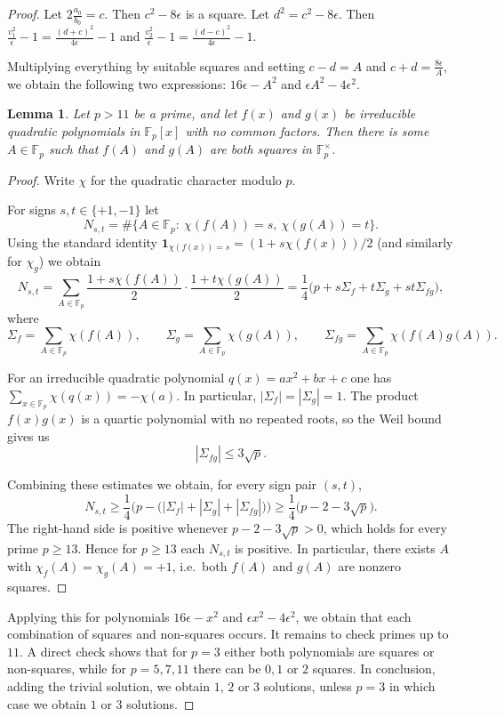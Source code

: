 \documentclass[10pt,leqno]{amsart}
\newcommand{\F}{\mathbb{F}}
\newtheorem{lemma}[theorem]{Lemma}
\theoremstyle{definition}
\theoremstyle{remark}
\numberwithin{theorem}{section}
\begin{document}
\begin{proof}
Let $2\frac{a_0}{b_0}=c$. Then $c^2-8\epsilon$ is a square. Let $d^2=c^2-8\epsilon$. Then $\frac{v_1^2}{\epsilon}-1=\frac{(d+c)^2}{4\epsilon}-1$ and $\frac{v_2^2}{\epsilon}-1=\frac{(d-c)^2}{4\epsilon}-1.$

Multiplying everything by suitable squares and setting $c-d=A$ and $c+d=\frac{8\epsilon }{A}$, we obtain the following two expressions: $16\epsilon-A^2$ and $\epsilon A^2-4\epsilon^2$. 

\begin{lemma}
    Let $p>11$ be a prime, and let $f(x)$ and $g(x)$ be irreducible quadratic polynomials in $\F_p[x]$ with no common factors. Then there is some $A\in \F_p$ such that $f(A)$ and $g(A)$ are both squares in $\F_p^\times$.
\end{lemma}
\begin{proof}
Write \(\chi\) for the quadratic character modulo \(p\).

For signs \(s,t\in\{+1,-1\}\) let
\[
N_{s,t}=\#\{A\in\F_p:\ \chi(f(A))=s,\ \chi(g(A))=t\}.
\]
Using the standard identity \(\mathbf{1}_{\chi(f(x))=s}=(1+s\chi(f(x)))/2\) (and similarly for \(\chi_g\)) we obtain
\[
N_{s,t}=\sum_{A\in\F_p}\frac{1+s\chi(f(A))}{2}\cdot\frac{1+t\chi(g(A))}{2}
=\frac{1}{4}\Big(p+s\Sigma_f+t\Sigma_g+st\Sigma_{fg}\Big),
\]
where
\[
\Sigma_f=\sum_{A\in\F_p}\chi(f(A)),\qquad
\Sigma_g=\sum_{A\in\F_p}\chi(g(A)),\qquad
\Sigma_{fg}=\sum_{A\in\F_p}\chi(f(A)g(A)).
\]


For an irreducible quadratic polynomial \(q(x)=ax^2+bx+c\) one has \(\sum_{x\in\F_p}\chi(q(x))=-\chi(a).\) In particular, \(|\Sigma_f|=|\Sigma_g|=1\).  
The product \(f(x)g(x)\) is a quartic polynomial with no repeated roots, so the Weil bound gives us
\[
|\Sigma_{fg}|\leq  3\sqrt p.
\]

Combining these estimates we obtain, for every sign pair \((s,t)\),
\[
N_{s,t}\ge \frac{1}{4}\Big(p - \big(|\Sigma_f|+|\Sigma_g|+|\Sigma_{fg}|\big)\Big)
\ge \frac{1}{4}\big(p - 2 - 3\sqrt p\big).
\]
The right-hand side is positive whenever \(p-2-3\sqrt p>0\), which holds for every prime \(p\ge 13\). Hence for \(p\ge 13\) each \(N_{s,t}\) is positive. In particular, there exists \(A\) with \(\chi_f(A)=\chi_g(A)=+1\), i.e.\ both \(f(A)\) and \(g(A)\) are nonzero squares.
\end{proof}

Applying this for polynomials $16\epsilon-x^2$ and $\epsilon x^2-4\epsilon^2$, we obtain that each combination of squares and non-squares occurs. It remains to check primes up to $11$. A direct check shows that for $p=3$ either both polynomials are squares or non-squares, while for $p=5,7,11$ there can be $0,1$ or $2$ squares. In conclusion, adding the trivial solution, we obtain $1$, $2$ or $3$ solutions, unless $p=3$ in which case we obtain $1$ or $3$ solutions.



\end{proof}
\end{document}
